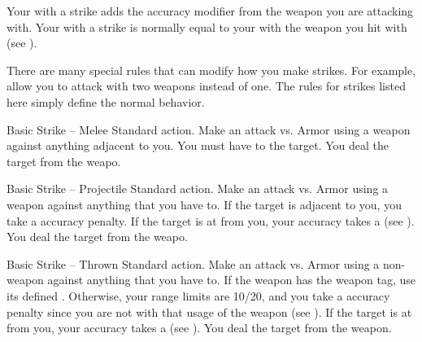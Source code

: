         Your  with a strike adds the accuracy modifier from the weapon you are attacking with.
        Your  with a strike is normally equal to your  with the weapon you hit with (see ).

        There are many special rules that can modify how you make strikes.
        For example,  allow you to attack with two weapons instead of one.
        The rules for strikes listed here simply define the normal behavior.

        \begin{activeability}{Basic Strike -- Melee}
            \label{Melee Strike}
            \abilityusagetime Standard action.
            \rankline
            Make an attack vs. Armor using a weapon against anything adjacent to you.
            You must have  to the target.
            \hit You deal the target  from the weapo.
        \end{activeability}

        \begin{activeability}{Basic Strike -- Projectile}
            \label{Projectile Strike}
            \abilityusagetime Standard action.
            \rankline
            Make an attack vs. Armor using a  weapon against anything that you have  to.
            If the target is adjacent to you, you take a  accuracy penalty.
            If the target is at  from you, your accuracy takes a   (see ).
            \hit You deal the target  from the weapo.
        \end{activeability}

        \begin{activeability}{Basic Strike -- Thrown}
            \label{Thrown Strike}
            \abilityusagetime Standard action.
            \rankline
            Make an attack vs. Armor using a non- weapon against anything that you have  to.
            If the weapon has the  weapon tag, use its defined .
            Otherwise, your range limits are 10/20, and you take a  accuracy penalty since you are not  with that usage of the weapon (see ).
            If the target is at  from you, your accuracy takes a   (see ).
            \hit You deal the target  from the weapon.
        \end{activeability}

